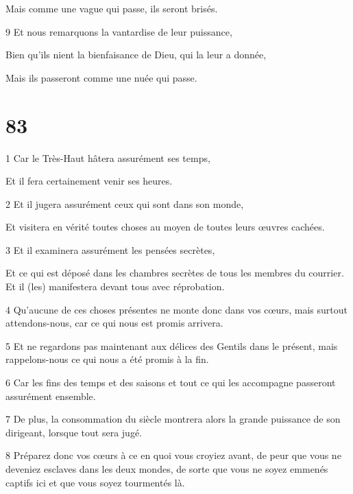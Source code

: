 \par Mais comme une vague qui passe, ils seront brisés.

\par 9 Et nous remarquons la vantardise de leur puissance,

\par Bien qu'ils nient la bienfaisance de Dieu, qui la leur a donnée,

\par Mais ils passeront comme une nuée qui passe.

\chapter{83}

\par 1 Car le Très-Haut hâtera assurément ses temps,

\par Et il fera certainement venir ses heures.

\par 2 Et il jugera assurément ceux qui sont dans son monde,

\par Et visitera en vérité toutes choses au moyen de toutes leurs œuvres cachées.

\par 3 Et il examinera assurément les pensées secrètes,

\par Et ce qui est déposé dans les chambres secrètes de tous les membres du courrier. Et il (les) manifestera devant tous avec réprobation.

\par 4 Qu'aucune de ces choses présentes ne monte donc dans vos cœurs, mais surtout attendons-nous, car ce qui nous est promis arrivera.

\par 5 Et ne regardons pas maintenant aux délices des Gentils dans le présent, mais rappelons-nous ce qui nous a été promis à la fin.

\par 6 Car les fins des temps et des saisons et tout ce qui les accompagne passeront assurément ensemble.

\par 7 De plus, la consommation du siècle montrera alors la grande puissance de son dirigeant, lorsque tout sera jugé.

\par 8 Préparez donc vos cœurs à ce en quoi vous croyiez avant, de peur que vous ne deveniez esclaves dans les deux mondes, de sorte que vous ne soyez emmenés captifs ici et que vous soyez tourmentés là.

